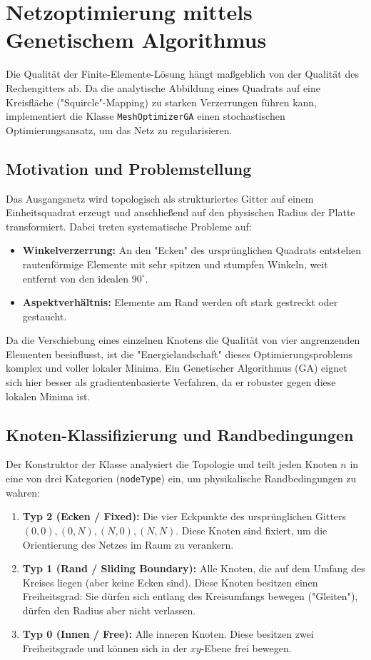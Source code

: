 \documentclass[a4paper,12pt]{article}
\begin{document}
\section{Netzoptimierung mittels Genetischem Algorithmus}

Die Qualität der Finite-Elemente-Lösung hängt maßgeblich von der Qualität des Rechengitters ab. Da die analytische Abbildung eines Quadrats auf eine Kreisfläche ("Squircle"-Mapping) zu starken Verzerrungen führen kann, implementiert die Klasse \texttt{MeshOptimizerGA} einen stochastischen Optimierungsansatz, um das Netz zu regularisieren.

\subsection{Motivation und Problemstellung}
Das Ausgangsnetz wird topologisch als strukturiertes Gitter auf einem Einheitsquadrat erzeugt und anschließend auf den physischen Radius der Platte transformiert. Dabei treten systematische Probleme auf:
\begin{itemize}
    \item \textbf{Winkelverzerrung:} An den "Ecken" des ursprünglichen Quadrats entstehen rautenförmige Elemente mit sehr spitzen und stumpfen Winkeln, weit entfernt von den idealen $90^\circ$.
    \item \textbf{Aspektverhältnis:} Elemente am Rand werden oft stark gestreckt oder gestaucht.
\end{itemize}
Da die Verschiebung eines einzelnen Knotens die Qualität von vier angrenzenden Elementen beeinflusst, ist die "Energielandschaft" dieses Optimierungsproblems komplex und voller lokaler Minima. Ein Genetischer Algorithmus (GA) eignet sich hier besser als gradientenbasierte Verfahren, da er robuster gegen diese lokalen Minima ist.

\subsection{Knoten-Klassifizierung und Randbedingungen}
Der Konstruktor der Klasse analysiert die Topologie und teilt jeden Knoten $n$ in eine von drei Kategorien (\texttt{nodeType}) ein, um physikalische Randbedingungen zu wahren:

\begin{enumerate}
    \item \textbf{Typ 2 (Ecken / Fixed):} Die vier Eckpunkte des ursprünglichen Gitters $(0,0), (0,N), (N,0), (N,N)$. Diese Knoten sind fixiert, um die Orientierung des Netzes im Raum zu verankern.
    \item \textbf{Typ 1 (Rand / Sliding Boundary):} Alle Knoten, die auf dem Umfang des Kreises liegen (aber keine Ecken sind). Diese Knoten besitzen einen Freiheitsgrad: Sie dürfen sich entlang des Kreisumfangs bewegen ("Gleiten"), dürfen den Radius aber nicht verlassen.
    \item \textbf{Typ 0 (Innen / Free):} Alle inneren Knoten. Diese besitzen zwei Freiheitsgrade und können sich in der $xy$-Ebene frei bewegen.
\end{enumerate}
\end{document}
